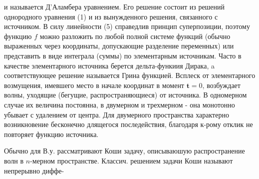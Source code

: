 \documentclass[10pt]{article}
\begin{document}
и называется Д’Аламбера уравнением. Его решение состоит из решений однородного уравнения (1) и из вынужденного решения, связанного с источником. В силу линейности (5) справедлив принцип суперпозиции, поэтому функцию $f$ можно разложить по любой полной системе функций (обычно выраженных через координаты, допускающие разделение переменных) или представить в виде интеграла (суммы) по элементарным источникам. Часто в качестве элементарного источника берется дельта-функиия Дирака, a соответствующее решение называется Грина функцией. Всплеск от элементарного возмущения, имевшего место в начале координат в момент $\boldsymbol{t}=0$, возбуждает волны, уходящие (бегущие, распространяющиеся) от источника. В одномерном случае их величина постоянна, в двумерном и трехмерном - она монотонно убывает с удалением от центра. Для двумерного пространства характерно возникновение бесконечно длящегося последействия, благодаря к-рому отклик не повторяет функцию источника.



Обычно для В.у. рассматривают Коши задачу, описываюшую распространение волн в $n$-мерном пространстве. Классич. решением задачи Коши называют непрерывно диффе-
\end{document}
